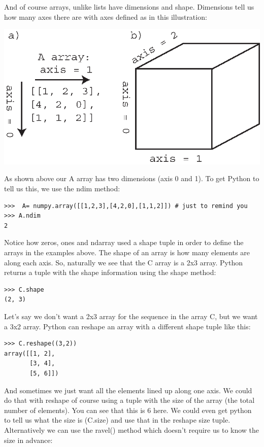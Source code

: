 \documentclass[11pt]{book}
\begin{document}
{{{ And of course  arrays, unlike lists have dimensions and shape.  Dimensions tell us how many axes there are with axes defined as in this illustration:

   \includegraphics[width=15cm]{EPSfiles/ndim.eps} 
   
   As shown above our {\color{blue}A} array has two dimensions (axis 0 and 1).  To get Python to tell us this, we use the {\color{blue}ndim} method:
   
   { \color{blue} \begin{verbatim}
>>>  A= numpy.array([[1,2,3],[4,2,0],[1,1,2]]) # just to remind you
>>> A.ndim
2
\end{verbatim}}
Notice how {\color{blue}zeros, ones} and {\color{blue}ndarray} used a shape tuple in order to define the arrays in the examples above.   The shape of an array is how many elements are along each axis.  So, naturally we see that the C array is a 2x3 array.  Python returns a tuple with the shape information using the {\color{blue}shape} method:
{ \color{blue} \begin{verbatim}
>>> C.shape
(2, 3)
\end{verbatim}}

Let's say we don't want a 2x3 array for the sequence in the array {\color{blue}C}, but we want a 3x2 array.  Python can reshape an array with a different shape tuple like this:
   { \color{blue} \begin{verbatim}
>>> C.reshape((3,2))
array([[1, 2],
       [3, 4],
       [5, 6]])
\end{verbatim}}

And sometimes we just want all the elements lined up along one axis. We could do that with {\color{blue}reshape} of course using a tuple  with the size of the array (the total number of elements). You  can see that this is 6 here. We could even get python to tell us what the size is ({\color{blue}C.size}) and use that in the reshape size tuple.  Alternatively we can use the {\color{blue}ravel()} method which doesn't require us to know the size in advance:

}}}
\end{document}
